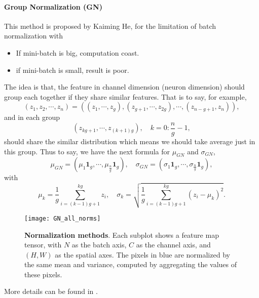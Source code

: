 

\paragraph{Group Normalization (GN)}
This method is proposed by Kaiming He, 
for the limitation of batch normalization with
\begin{itemize}
	\item If mini-batch is big, computation coast.
	\item if mini-batch is small, result is poor.
\end{itemize}
The idea is that, the feature in channel dimension (neuron dimension) should
group each together if they share similar features. That is to say, for example,
$$
(z_1, z_2, \cdots, z_n) = \left( (z_{1}, \cdots, z_{g}), (z_{g+1}, \cdots, z_{2g}), \cdots, (z_{n-g+1}, z_{n})\right),
$$
and in each group 
$$
(z_{kg+1}, \cdots, z_{(k+1)g}), \quad k = 0:\frac{n}{g}-1,
$$
should share the similar distribution which means we should take average just in this group.
Thus to say, we have the next formula for $\mu_{GN}$ and $\sigma_{GN}$,
\begin{equation}\label{eq:GN-mu}
\mu_{GN} = (\mu_1 \bm 1_{g}, \cdots, \mu_{\frac{n}{g}} \bm 1_g), \quad \sigma_{GN} = (\sigma_1 \bm 1_{g}, \cdots, \sigma_{\frac{n}{g}} \bm 1_g),
\end{equation}
with 
$$
\mu_{k} = \frac{1}{g}\sum_{i = (k-1)g+1}^{kg} z_i, \quad \sigma_k = \sqrt{\frac{1}{g} \sum_{i = (k-1)g+1}^{kg}(z_i - \mu_k)^2}.
$$

\begin{figure*}[!htb]
	\centering
	\texttt{[image: GN\_all\_norms]}
	\vspace{.5em}
	\caption{\textbf{Normalization methods}. Each subplot shows a feature map tensor, with $N$ as the batch axis, $C$ as the channel axis, and $(H, W)$ as the spatial axes.
		The pixels in blue are normalized by the same mean and variance, computed by aggregating the values of these pixels.
	}
	\label{fig:all_norms}
	\vspace{-.5em}
\end{figure*}
More details can be found in \cite{wu2018group}.




